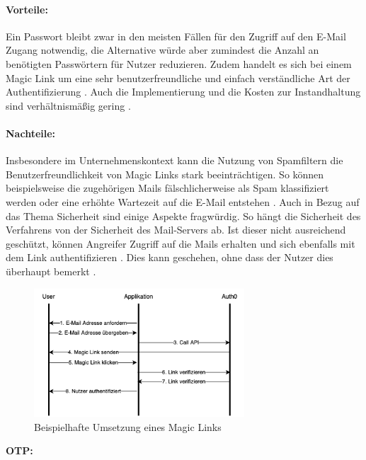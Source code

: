 \paragraph*{Vorteile:} Ein Passwort bleibt zwar in den meisten Fällen für den Zugriff auf den E-Mail Zugang notwendig, die Alternative würde aber zumindest die Anzahl an benötigten Passwörtern für Nutzer reduzieren. Zudem handelt es sich bei einem Magic Link um eine sehr benutzerfreundliche und einfach verständliche Art der Authentifizierung \cite{parmar2022comprehensive}. Auch die Implementierung und die Kosten zur Instandhaltung sind verhältnismäßig gering \cite{parmar2022comprehensive}.

\paragraph*{Nachteile:} Insbesondere im Unternehmenskontext kann die Nutzung von Spamfiltern die Benutzerfreundlichkeit von Magic Links stark beeinträchtigen. So können beispielsweise die zugehörigen Mails fälschlicherweise als Spam klassifiziert werden oder eine erhöhte Wartezeit auf die E-Mail entstehen \cite{parmar2022comprehensive}. Auch in Bezug auf das Thema Sicherheit sind einige Aspekte fragwürdig. So hängt die Sicherheit des Verfahrens von der Sicherheit des Mail-Servers ab. Ist dieser nicht ausreichend geschützt, können Angreifer Zugriff auf die Mails erhalten und sich ebenfalls mit dem Link authentifizieren \cite{chowhan2019password}. Dies kann geschehen, ohne dass der Nutzer dies überhaupt bemerkt \cite{chowhan2019password}.

\begin{figure}[h]
	\centering 
	\includegraphics[width=0.7\textwidth]{img/abbildungen/magic_link.png}
	\captionsetup{format=hang}
	\caption{Beispielhafte Umsetzung eines Magic Links} \label{magiclink}
\end{figure}

\textbf{\ac{OTP}:}

